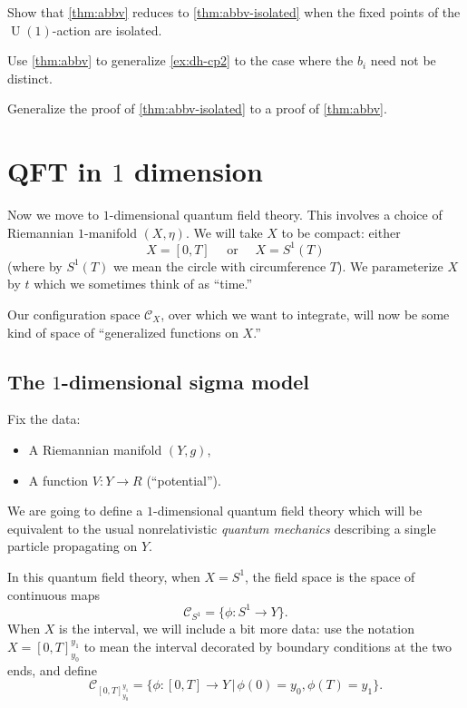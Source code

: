 \documentclass[12pt,letterpaper,reqno]{article}
\numberwithin{equation}{section}
\newcommand{\cC}{\ensuremath{\mathcal C}}
\newcommand{\ti}[1]{\textit{#1}}
\DeclareMathOperator{\U}{U}
\newcommand{\fixme}[1]{{\color{orange}{[#1]}}}
\begin{document}
\begin{exercise} Show that \autoref{thm:abbv} reduces to
\autoref{thm:abbv-isolated} when the fixed points of the
$\U(1)$-action are isolated.
\end{exercise}

\begin{exercise} Use \autoref{thm:abbv} to generalize
\autoref{ex:dh-cp2} to the case
where the $b_i$ need not be distinct.
\end{exercise}

\begin{exercise} Generalize the proof
of \autoref{thm:abbv-isolated} to a proof of \autoref{thm:abbv}. \fixme{hard? at least needs more delicacy with the steepest descent expansion}
\end{exercise}


\section{QFT in \texorpdfstring{$1$}{1} dimension}

Now we move to $1$-dimensional quantum field theory.
This involves a choice of Riemannian $1$-manifold $(X,\eta)$.
We will take $X$ to be compact: either
\begin{equation}
  X = [0,T] \quad \text{ or } \quad X = S^1(T)
\end{equation}
(where by $S^1(T)$ we mean the circle with circumference $T$).
We parameterize $X$ by $t$ which we sometimes
think of as ``time.''

Our configuration space $\cC_X$, over which we want to integrate,
will now be some kind of space
of ``generalized functions on $X$.''


\subsection{The \texorpdfstring{$1$}{1}-dimensional sigma model}

Fix the data:
\begin{itemize}
  \item A Riemannian manifold $(Y,g)$,
  \item A function $V: Y \to R$ (``potential'').
\end{itemize}
We are going to define a $1$-dimensional quantum field theory 
which will be equivalent to
the usual nonrelativistic \ti{quantum mechanics}
describing a single particle propagating on $Y$.

In this quantum field theory, when $X = S^1$, the
field space is the space of continuous maps
\begin{equation}
  \cC_{S^1} = \{ \phi: S^1 \to Y\}.
\end{equation}
When $X$ is the interval, we will include a bit more data:
use the notation $X = [0,T]_{y_0}^{y_1}$ to mean the
interval decorated by boundary conditions at the two ends, and
define
\begin{equation}
  \cC_{[0,T]_{y_0}^{y_1}} = \{\phi: [0,T] \to Y \, \vert \, \phi(0) = y_0, \phi(T) = y_1\}.
\end{equation}
\end{document}
